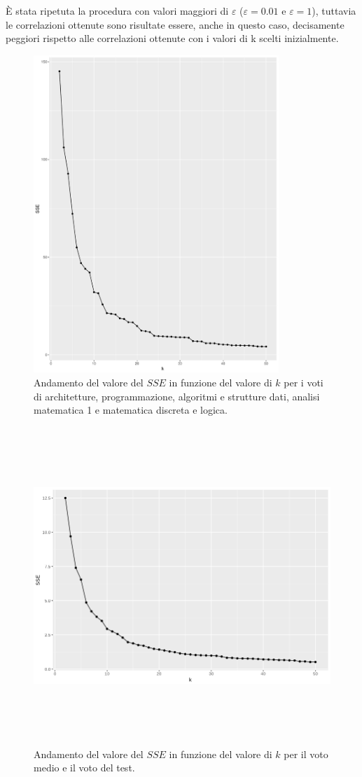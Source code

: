 \documentclass[12pt]{article}
\begin{document}
È stata ripetuta la procedura con valori maggiori di $\varepsilon$ ($\varepsilon=0.01$ e $\varepsilon=1$), tuttavia le correlazioni ottenute sono risultate essere, anche in questo caso, decisamente peggiori rispetto alle correlazioni ottenute con i valori di k scelti inizialmente.
\begin{figure}[H]
	\centering
	\includegraphics[width=\textwidth, height=12cm,keepaspectratio]{img/k-sse-asd-arc-prg-an1-mdl.pdf}
	\caption{Andamento del valore del $SSE$ in funzione del valore di $k$ per i voti di architetture, programmazione, algoritmi e strutture dati, analisi matematica 1 e matematica discreta e logica.}
	\label{fig:k-sse2}
\end{figure}

\begin{figure}[H]
	\centering
	\includegraphics[width=\textwidth, height=12cm,keepaspectratio]{img/k-sse-voto_medio-test.png}
	\caption{Andamento del valore del $SSE$ in funzione del valore di $k$ per il voto medio e il voto del test.}
	\label{fig:k-sse3}
\end{figure}
\end{document}
